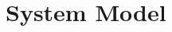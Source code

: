 \documentclass[conference]{IEEEtran}
\begin{document}




\section{System Model}\label{sec:system_model}
\end{document}
